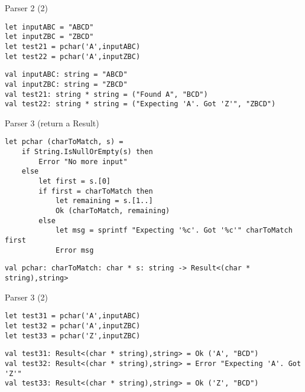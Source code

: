 \documentclass[t]{beamer}
\begin{document}
\begin{frame}[label={sec:org360c6cc},fragile]{Parser 2 (2)}
 \begin{verbatim}
let inputABC = "ABCD"
let inputZBC = "ZBCD"
let test21 = pchar('A',inputABC) 
let test22 = pchar('A',inputZBC)
\end{verbatim}

\begin{verbatim}
val inputABC: string = "ABCD"
val inputZBC: string = "ZBCD"
val test21: string * string = ("Found A", "BCD")
val test22: string * string = ("Expecting 'A'. Got 'Z'", "ZBCD")
\end{verbatim}
\end{frame}

\begin{frame}[label={sec:org7cb0886},fragile]{Parser 3 (return a Result)}
 \begin{verbatim}
let pchar (charToMatch, s) =
    if String.IsNullOrEmpty(s) then
        Error "No more input"
    else
        let first = s.[0]
        if first = charToMatch then
            let remaining = s.[1..]
            Ok (charToMatch, remaining)
        else
            let msg = sprintf "Expecting '%c'. Got '%c'" charToMatch first
            Error msg
\end{verbatim}

\begin{verbatim}
val pchar: charToMatch: char * s: string -> Result<(char * string),string>
\end{verbatim}
\end{frame}

\begin{frame}[label={sec:orgeacafaf},fragile]{Parser 3 (2)}
 \begin{verbatim}
let test31 = pchar('A',inputABC) 
let test32 = pchar('A',inputZBC) 
let test33 = pchar('Z',inputZBC)
\end{verbatim}

\begin{verbatim}
val test31: Result<(char * string),string> = Ok ('A', "BCD")
val test32: Result<(char * string),string> = Error "Expecting 'A'. Got 'Z'"
val test33: Result<(char * string),string> = Ok ('Z', "BCD")
\end{verbatim}
\end{frame}
\end{document}
